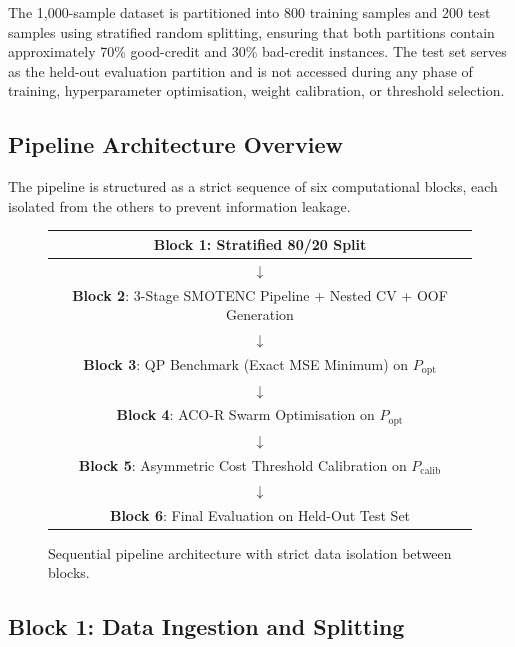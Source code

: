 \documentclass[12pt,a4paper]{article}
\begin{document}
The 1,000-sample dataset is partitioned into 800 training samples and 200 test samples using stratified random splitting, ensuring that both partitions contain approximately 70\% good-credit and 30\% bad-credit instances. The test set serves as the held-out evaluation partition and is not accessed during any phase of training, hyperparameter optimisation, weight calibration, or threshold selection.

\subsection{Pipeline Architecture Overview}

The pipeline is structured as a strict sequence of six computational blocks, each isolated from the others to prevent information leakage.

\begin{figure}[H]
\centering
\begin{tabular}{|c|}
\hline
\textbf{Block 1}: Stratified 80/20 Split \\
\hline
$\downarrow$ \\
\hline
\textbf{Block 2}: 3-Stage SMOTENC Pipeline + Nested CV + OOF Generation \\
\hline
$\downarrow$ \\
\hline
\textbf{Block 3}: QP Benchmark (Exact MSE Minimum) on $P_\text{opt}$ \\
\hline
$\downarrow$ \\
\hline
\textbf{Block 4}: ACO-R Swarm Optimisation on $P_\text{opt}$ \\
\hline
$\downarrow$ \\
\hline
\textbf{Block 5}: Asymmetric Cost Threshold Calibration on $P_\text{calib}$ \\
\hline
$\downarrow$ \\
\hline
\textbf{Block 6}: Final Evaluation on Held-Out Test Set \\
\hline
\end{tabular}
\caption{Sequential pipeline architecture with strict data isolation between blocks.}
\label{fig:pipeline}
\end{figure}

\subsection{Block 1: Data Ingestion and Splitting}
\end{document}
